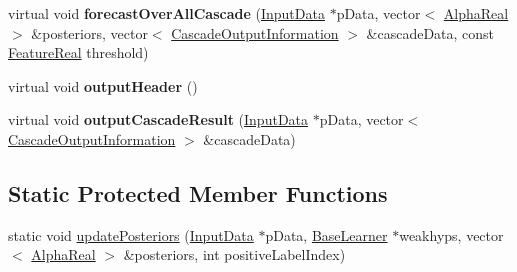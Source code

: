 \begin{DoxyCompactItemize}
\item 
\hypertarget{classMultiBoost_1_1VJCascadeLearner_ab23a15e6ca703f3605cf8dd6317b3d06}{virtual void {\bfseries forecast\-Over\-All\-Cascade} (\hyperlink{classMultiBoost_1_1InputData}{Input\-Data} $\ast$p\-Data, vector$<$ \hyperlink{Defaults_8h_a80184c4fd10ab70a1a17c5f97dcd1563}{Alpha\-Real} $>$ \&posteriors, vector$<$ \hyperlink{structMultiBoost_1_1CascadeOutputInformation}{Cascade\-Output\-Information} $>$ \&cascade\-Data, const \hyperlink{Defaults_8h_a3a11cfe6a5d469d921716ca6291e934f}{Feature\-Real} threshold)}\label{classMultiBoost_1_1VJCascadeLearner_ab23a15e6ca703f3605cf8dd6317b3d06}

\item 
\hypertarget{classMultiBoost_1_1VJCascadeLearner_a20ac82bc93d06a3745016862a515929e}{virtual void {\bfseries output\-Header} ()}\label{classMultiBoost_1_1VJCascadeLearner_a20ac82bc93d06a3745016862a515929e}

\item 
\hypertarget{classMultiBoost_1_1VJCascadeLearner_a7de72edb5b7475605fbd1410235839fe}{virtual void {\bfseries output\-Cascade\-Result} (\hyperlink{classMultiBoost_1_1InputData}{Input\-Data} $\ast$p\-Data, vector$<$ \hyperlink{structMultiBoost_1_1CascadeOutputInformation}{Cascade\-Output\-Information} $>$ \&cascade\-Data)}\label{classMultiBoost_1_1VJCascadeLearner_a7de72edb5b7475605fbd1410235839fe}

\end{DoxyCompactItemize}
\subsection*{Static Protected Member Functions}
\begin{DoxyCompactItemize}
\item 
static void \hyperlink{classMultiBoost_1_1VJCascadeLearner_a101b217959f4fe2ac51eeecd7ce4d080}{update\-Posteriors} (\hyperlink{classMultiBoost_1_1InputData}{Input\-Data} $\ast$p\-Data, \hyperlink{classMultiBoost_1_1BaseLearner}{Base\-Learner} $\ast$weakhyps, vector$<$ \hyperlink{Defaults_8h_a80184c4fd10ab70a1a17c5f97dcd1563}{Alpha\-Real} $>$ \&posteriors, int positive\-Label\-Index)
\end{DoxyCompactItemize}
